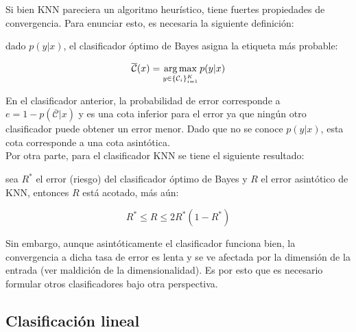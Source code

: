Si bien KNN pareciera un algoritmo heurístico, tiene fuertes propiedades de convergencia. Para enunciar esto, es necesaria la siguiente definición:

\begin{definition}
	dado $p(y|x)$, el clasificador óptimo de Bayes asigna la etiqueta más probable:
	
	\begin{equation}
		\overline{\mathcal{C}}(x)=\operatorname*{arg\,max}_{y\in \{{\mathcal C}_i\}_{i=1}^K} p(y|x)
	\end{equation}
\end{definition}

En el clasificador anterior, la probabilidad de error corresponde a $e = 1 - p(\overline{\mathcal{C}}|x)$ y es una cota inferior para el error ya que ningún otro clasificador puede obtener un error menor. Dado que no se conoce $p(y|x)$, esta cota corresponde a una cota asintótica.\\

Por otra parte, para el clasificador KNN se tiene el siguiente resultado:

\begin{theorem} sea $R^*$ el error (riesgo) del clasificador óptimo de Bayes y $R$ el error asintótico de KNN, entonces $R$ está acotado, más aún:

\begin{equation}
	R^*\leq R\leq 2R^*(1-R^*)
\end{equation}
	
\end{theorem}

Sin embargo, aunque asintóticamente el clasificador funciona bien, la convergencia a dicha tasa de error es lenta y se ve afectada por la dimensión de la entrada (ver maldición de la dimensionalidad). Es por esto que es necesario formular otros clasificadores bajo otra perspectiva.


\subsection{Clasificación lineal}
\label{sec:clasif_lineal}

